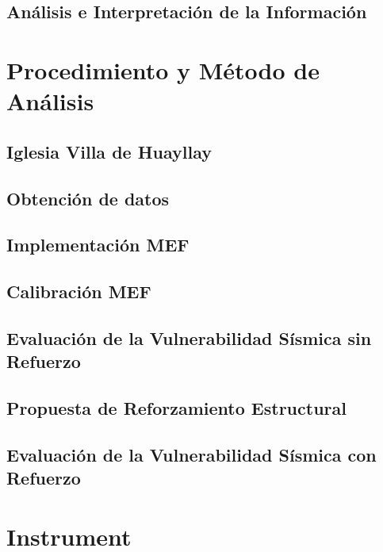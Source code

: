 \documentclass[doc, 12pt, a4paper, draftall]{apa7} %
\begin{document}
\subsection{Análisis e Interpretación de la Información}

\section{Procedimiento y Método de Análisis}

\subsection{Iglesia Villa de Huayllay}

\subsection{Obtención de datos}

\subsection{Implementación MEF}

\subsection{Calibración MEF}

\subsection{Evaluación de la Vulnerabilidad Sísmica sin Refuerzo}

\subsection{Propuesta de Reforzamiento Estructural}

\subsection{Evaluación de la Vulnerabilidad Sísmica con Refuerzo}


\backmatter %

\printbibliography[heading=bibintoc, title={Referencias}]

\appendix

\section{Instrument}
\label{app:instrument}
\end{document}
